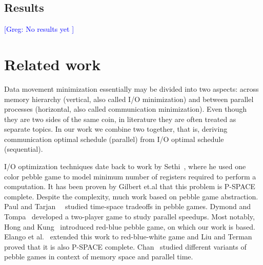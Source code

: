\documentclass[sigplan,review,anonymous]{acmart}\settopmatter{printfolios=true,printccs=false,printacmref=false}
\newcommand\greg[1]{\textcolor{blue}{[Greg: #1]}}
\begin{document}
\subsection{Results}
\greg{No results yet
}



\section{Related work}
Data movement minimization essentially may be divided into two aspects: across 
memory hierarchy (vertical, also called I/O minimization) and between parallel 
processes (horizontal, also called communication minimization). Even though 
they are two sides of the same coin, in literature they are often treated as 
separate topics. In our work we combine two together, that is, deriving 
communication optimal schedule (parallel) from I/O optimal schedule 
(sequential).

I/O optimization techniques date back to work by 
Sethi~\cite{completeRegisterProblems}, where he used one color pebble game to 
model minimum number of registers required to perform a computation. It has 
been proven by Gilbert et.al \cite{pebblegameregister} that this problem is 
P-SPACE complete. Despite the complexity, much work based on pebble game 
abstraction. Paul and Tarjan~~\cite{pebbleTradeoffs} studied time-space 
tradeoffs in pebble games. Dymond and Tompa~\cite{dymond2playerpebblegame} 
developed a 
two-player game to study parallel speedups. Most notably, Hong and 
Kung~\cite{redblue} introduced red-blue pebble game, on which our work is 
based. Elango et al.~\cite{redbluewhite} extended this work to red-blue-white 
game and Liu and Terman~\cite{redblueHard} proved that it is also P-SPACE 
complete. Chan~\cite{justApebbleGame} studied different variants of pebble 
games in context of memory space and parallel time.
\end{document}
